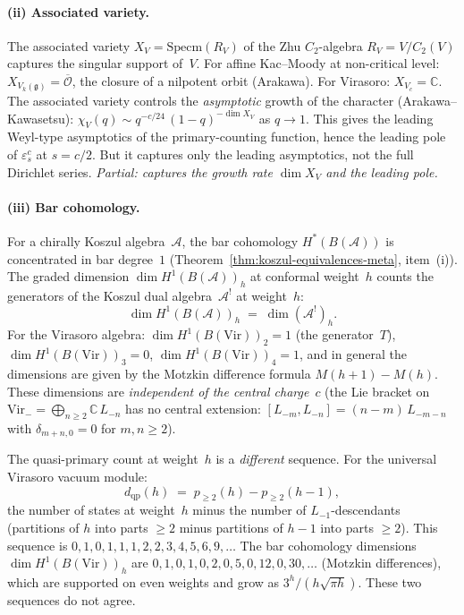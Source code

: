 \documentclass[11pt]{article}
\newcommand{\cA}{\mathcal{A}}
\newcommand{\cO}{\mathcal{O}}
\newcommand{\fg}{\mathfrak{g}}
\newcommand{\C}{\mathbb{C}}
\begin{document}
\paragraph{(ii) Associated variety.}
The associated variety $X_V = \mathrm{Specm}(R_V)$ of the Zhu
$C_2$-algebra $R_V = V/C_2(V)$ captures the singular support
of~$V$.  For affine Kac--Moody at non-critical level:
$X_{V_k(\fg)} = \overline{\cO}$, the closure of a nilpotent
orbit (Arakawa).  For Virasoro: $X_{V_c} = \C$.  The
associated variety controls the \emph{asymptotic} growth of
the character (Arakawa--Kawasetsu): $\chi_V(q) \sim
q^{-c/24}\,(1-q)^{-\dim X_V}$ as $q \to 1$.  This gives
the leading Weyl-type asymptotics of the primary-counting
function, hence the leading pole of $\varepsilon^c_s$ at
$s = c/2$.  But it captures only the leading asymptotics, not
the full Dirichlet series.  \emph{Partial: captures the growth
rate $\dim X_V$ and the leading pole.}

\paragraph{(iii) Bar cohomology.}
For a chirally Koszul algebra~$\cA$, the bar cohomology
$H^*(B(\cA))$ is concentrated in bar degree~$1$
(Theorem~\ref{thm:koszul-equivalences-meta}, item~(i)).
The graded dimension $\dim H^1(B(\cA))_h$ at conformal
weight~$h$ counts the generators of the Koszul dual
algebra~$\cA^!$ at weight~$h$:
\[
\dim H^1(B(\cA))_h \;=\; \dim (\cA^!)_h.
\]
For the Virasoro algebra: $\dim H^1(B(\mathrm{Vir}))_2 = 1$
(the generator~$T$), $\dim H^1(B(\mathrm{Vir}))_3 = 0$,
$\dim H^1(B(\mathrm{Vir}))_4 = 1$, and in general the
dimensions are given by the Motzkin difference formula
$M(h+1) - M(h)$.  These dimensions are \emph{independent of
the central charge}~$c$ (the Lie bracket on $\mathrm{Vir}_-
= \bigoplus_{n \geq 2} \C\,L_{-n}$ has no central extension:
$[L_{-m}, L_{-n}] = (n{-}m)\,L_{-m-n}$ with
$\delta_{m+n,0} = 0$ for $m,n \geq 2$).

The quasi-primary count at weight~$h$ is a \emph{different}
sequence.  For the universal Virasoro vacuum module:
\[
d_{\mathrm{qp}}(h)
\;=\; p_{\geq 2}(h) - p_{\geq 2}(h{-}1),
\]
the number of states at weight~$h$ minus the number of
$L_{-1}$-descendants (partitions of $h$ into parts $\geq 2$
minus partitions of $h{-}1$ into parts $\geq 2$).  This
sequence is $0, 1, 0, 1, 1, 1, 2, 2, 3, 4, 5, 6, 9, \ldots$
The bar cohomology dimensions $\dim H^1(B(\mathrm{Vir}))_h$
are $0, 1, 0, 1, 0, 2, 0, 5, 0, 12, 0, 30, \ldots$
(Motzkin differences), which are supported on even weights
and grow as $3^h/(h\sqrt{\pi h})$.  These two sequences do
not agree.
\end{document}
